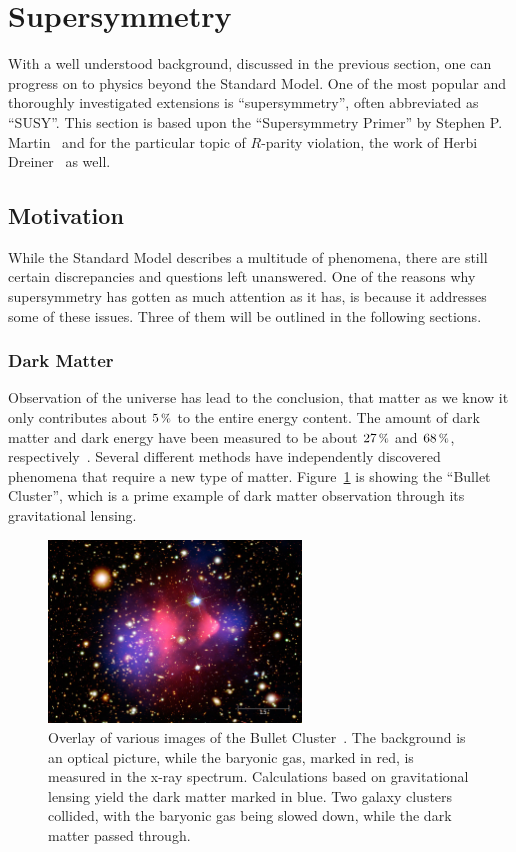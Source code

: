 \section{Supersymmetry}

With a well understood background, discussed in the previous section, one can progress on to physics beyond the Standard Model. One of the most popular and thoroughly investigated extensions is ``supersymmetry'', often abbreviated as ``SUSY''. This section is based upon the ``Supersymmetry Primer'' by Stephen P. Martin~\cite{susyprimer} and for the particular topic of $R$-parity violation, the work of Herbi Dreiner~\cite{b3def,b3p6} as well.

\subsection{Motivation}

While the Standard Model describes a multitude of phenomena, there are still certain discrepancies and questions left unanswered. One of the reasons why supersymmetry has gotten as much attention as it has, is because it addresses some of these issues. Three of them will be outlined in the following sections.

\subsubsection{Dark Matter}
\label{sec:dm}

Observation of the universe has lead to the conclusion, that matter as we know it only contributes about $5\,\pct$ to the entire energy content. The amount of dark matter and dark energy have been measured to be about $27\,\pct$ and $68\,\pct$, respectively~\cite{planck}. Several different methods have independently discovered phenomena that require a new type of matter. Figure~\ref{fig:gravlens} is showing the ``Bullet Cluster'', which is a prime example of dark matter observation through its gravitational lensing.

\begin{figure}[ht!]
  \centering
  \includegraphics[width=0.6\textwidth]{plots/bulletcluster.jpg}
  \caption{Overlay of various images of the Bullet Cluster~\cite{gravlens}. The background is an optical picture, while the baryonic gas, marked in red, is measured in the x-ray spectrum. Calculations based on gravitational lensing yield the dark matter marked in blue. Two galaxy clusters collided, with the baryonic gas being slowed down, while the dark matter passed through.}
  \label{fig:gravlens}
\end{figure}

